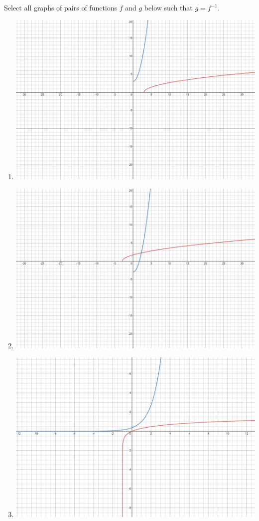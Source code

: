 \documentclass{ximera}
\author{Kenneth Berglund}
\begin{document}
\begin{exercise}
Select all graphs of pairs of functions $f$ and $g$ below such that $g = f^{-1}$.

\begin{enumerate}
\item
\begin{image}
\includegraphics[width=.7\textwidth]{IFR10a.png}
\end{image}
\item
\begin{image}
\includegraphics[width=.7\textwidth]{IFR10b.png}
\end{image}
\item
\begin{image}
\includegraphics[width=.7\textwidth]{IFR10c.png}

\end{image}
\end{enumerate}
\end{exercise}
\end{document}
